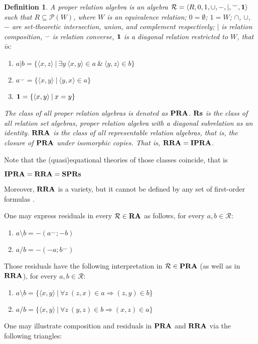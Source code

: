 \documentclass[a4paper]{article}
\theoremstyle{defin}
\newtheorem{defin}{Definition}
\theoremstyle{theorem}
\theoremstyle{prop}
\theoremstyle{lemma}
\theoremstyle{ex}
\theoremstyle{col}
\begin{document}
\begin{defin}
    A proper relation algebra is an algebra $\mathcal{R} = \langle R, 0, 1, \cup, -, |, {}^{\smile}, {\bf 1 }\rangle$ such that $R \subseteq \mathcal{P}(W)$, where $W$ is an equivalence relation; $0 = \emptyset$; $1 = W$; $\cap$, $\cup$, $-$ are set-theoretic intersection, union, and
    complement respectively; $|$ is relation composition, ${}^{\smile}$ is relation converse, ${\bf 1}$ is a
    diagonal relation restricted to $W$, that is:
    \begin{enumerate}
    \item $a | b = \{ \langle x, z \rangle \: | \: \exists y \: \langle x, y \rangle \in a \: \& \: \langle y, z \rangle \in b \}$
    \item $a^{\smile} = \{ \langle x, y \rangle \: | \: \langle y, x \rangle \in a \}$
    \item ${\bf 1} = \{ \langle x, y \rangle \: | \: x = y \}$
    \end{enumerate}
      The class of all proper relation algebras is denoted as ${\bf PRA}$. ${\bf Rs}$ is the class of all relation set algebras, proper relation algebra with a diagonal subrelation as an identity. ${\bf RRA}$ is the class of all representable relation algebras, that is, the closure of ${\bf PRA}$ under isomorphic copies. That is,
      ${\bf RRA} = {\bf IPRA}$.
\end{defin}
Note that the (quasi)equational theories of those classes coincide, that is
\begin{center}
  ${\bf IPRA} = {\bf RRA} = {\bf SP}{\bf Rs}$
\end{center}
Moreover, ${\bf RRA}$ is a variety, but it cannot be defined by any set of first-order formulas \cite{monk1964representable}.

One may express residuals in every $\mathcal{R} \in {\bf RA}$ as follows, for every $a, b \in \mathcal{R}$:

\begin{enumerate}
  \item $a \setminus b = -(a^{\smile} ; -b)$
  \item $a / b = - (- a ; b^{\smile})$
\end{enumerate}

Those residuals have the following interpretation in $\mathcal{R} \in {\bf PRA}$ (as well as in ${\bf RRA}$), for every $a, b \in \mathcal{R}$:
\begin{enumerate}
  \item $a \setminus b = \{ \langle x, y \rangle \: | \: \forall z \: (z, x) \in a \Rightarrow (z, y) \in b \}$
  \item $a / b = \{ \langle x, y \rangle \: | \: \forall z \: (y, z) \in b \Rightarrow (x, z) \in a \}$
\end{enumerate}
One may illustrate composition and residuals in ${\bf PRA}$ and ${\bf RRA}$ via the following triangles:
\end{document}
